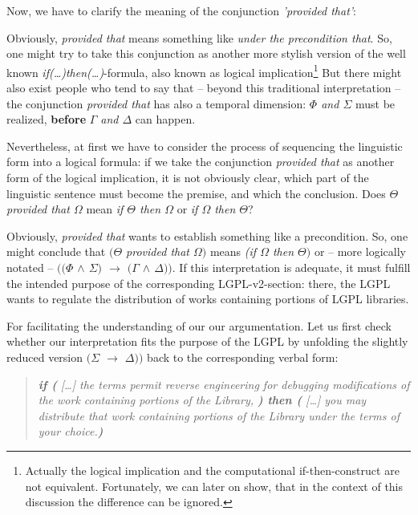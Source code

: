 Now, we have to clarify the meaning of the conjunction \emph{'provided that'}:

Obviously, \emph{provided that} means something like \emph{under the
precondition that}. So, one might try to take this conjunction as another more
stylish version of the well known \emph{if(\ldots)then(\ldots)}-formula, also
known as logical implication\footnote{Actually the logical implication and the
computational if-then-construct are not equivalent. Fortunately, we can later on
show, that in the context of this discussion the difference can be ignored.} But
there might also exist people who tend to say that -- beyond this traditional
interpretation -- the conjunction \emph{provided that} has also a temporal
dimension: \emph{$\Phi$ and $\Sigma$} must be realized, \textbf{before}
\emph{$\Gamma$ and $\Delta$} can happen.

Nevertheless, at first we have to consider the process of sequencing the
linguistic form into a logical formula: if we take the conjunction
\emph{provided that} as another form of the logical implication, it is not
obviously clear, which part of the  linguistic sentence must become the premise,
and which the conclusion. Does \emph{$\Theta$ provided that $\Omega$} mean
\emph{if $\Theta$ then $\Omega$} or \emph{if $\Omega$ then $\Theta$}?

Obviously, \emph{provided that} wants to establish something like a
precondition. So, one might conclude that \emph{$(\Theta$ provided that
$\Omega)$} means \emph{(if $\Omega$ then $\Theta)$} or -- more logically notated
-- \emph{$((\Phi$ $\wedge$ $\Sigma)$ $\rightarrow$ $(\Gamma$ $\wedge$
$\Delta))$}. If this interpretation is adequate, it must fulfill the intended
purpose of the corresponding LGPL-v2-section: there, the LGPL wants to regulate
the distribution of works containing portions of LGPL libraries. 

For facilitating the understanding of our our argumentation. Let us first 
check whether our interpretation fits the purpose of the LGPL by unfolding
the slightly reduced version \emph{$(\Sigma$ $\rightarrow$ $\Delta))$} back to
the corresponding verbal form:

\begin{quote}\noindent\emph{\textbf{if (} [\ldots] the terms permit reverse
engineering for debugging modifications of the work containing portions of the
Library, \textbf{) then (} [\ldots] you may distribute that work containing
portions of the Library under the terms of your choice.\textbf{)}}\end{quote}

